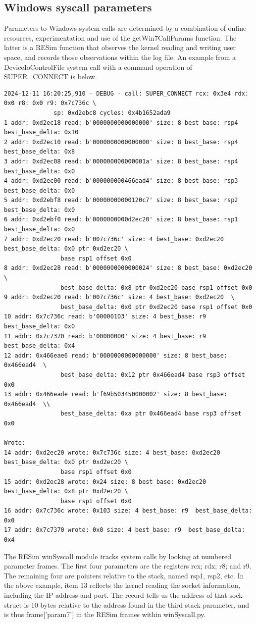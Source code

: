 \documentclass[titlepage]{article}
\begin{document}
\begin{appendices}
\subsection{Windows syscall parameters}
Parameters to Windows system calls are determined by a combination of online resources, experimentation and use
of the getWin7CallParams function.  The latter is a RESim function that observes the kernel reading and writing user
space, and records those observations within the log file.  An example from a DeviceIoControlFile system call with a
command operation of SUPER\_CONNECT is below.
\begin{verbatim}
2024-12-11 16:20:25,910 - DEBUG - call: SUPER_CONNECT rcx: 0x3e4 rdx: 0x0 r8: 0x0 r9: 0x7c736c \
              sp: 0xd2ebc8 cycles: 0x4b1652ada9
1 addr: 0xd2ec18 read: b'0000000000000000' size: 8 best_base: rsp4  best_base_delta: 0x10
2 addr: 0xd2ec10 read: b'0000000000000000' size: 8 best_base: rsp4  best_base_delta: 0x8
3 addr: 0xd2ec08 read: b'000000000000001a' size: 8 best_base: rsp4  best_base_delta: 0x0
4 addr: 0xd2ec00 read: b'000000000466ead4' size: 8 best_base: rsp3  best_base_delta: 0x0
5 addr: 0xd2ebf8 read: b'00000000000120c7' size: 8 best_base: rsp2  best_base_delta: 0x0
6 addr: 0xd2ebf0 read: b'0000000000d2ec20' size: 8 best_base: rsp1  best_base_delta: 0x0
7 addr: 0xd2ec20 read: b'007c736c' size: 4 best_base: 0xd2ec20  best_base_delta: 0x0 ptr 0xd2ec20 \
                base rsp1 offset 0x0
8 addr: 0xd2ec28 read: b'0000000000000024' size: 8 best_base: 0xd2ec20  \
                best_base_delta: 0x8 ptr 0xd2ec20 base rsp1 offset 0x0
9 addr: 0xd2ec20 read: b'007c736c' size: 4 best_base: 0xd2ec20  \
                best_base_delta: 0x0 ptr 0xd2ec20 base rsp1 offset 0x0
10 addr: 0x7c736c read: b'00000103' size: 4 best_base: r9  best_base_delta: 0x0
11 addr: 0x7c7370 read: b'00000000' size: 4 best_base: r9  best_base_delta: 0x4
12 addr: 0x466eae6 read: b'0000000000000000' size: 8 best_base: 0x466ead4  \
                best_base_delta: 0x12 ptr 0x466ead4 base rsp3 offset 0x0
13 addr: 0x466eade read: b'f69b503450000002' size: 8 best_base: 0x466ead4  \\
                best_base_delta: 0xa ptr 0x466ead4 base rsp3 offset 0x0

Wrote:
14 addr: 0xd2ec20 wrote: 0x7c736c size: 4 best_base: 0xd2ec20  best_base_delta: 0x0 ptr 0xd2ec20 \
                base rsp1 offset 0x0
15 addr: 0xd2ec28 wrote: 0x24 size: 8 best_base: 0xd2ec20  best_base_delta: 0x8 ptr 0xd2ec20 \
                base rsp1 offset 0x0
16 addr: 0x7c736c wrote: 0x103 size: 4 best_base: r9  best_base_delta: 0x0
17 addr: 0x7c7370 wrote: 0x0 size: 4 best_base: r9  best_base_delta: 0x4
\end{verbatim}
The RESim winSyscall module tracks system calls by looking at numbered parameter frames.  The first four parameters
are the registers rcx; rdx; r8; and r9.  The remaining four are pointers relative to the stack, named rsp1, rsp2, etc.
In the above example, item 13 reflects the kernel reading the socket information, including the IP address and port.
The record tells us the address of that sock struct is 10 bytes relative to the address found in the third stack parameter,
and is thus frame['param7'] in the RESim frames within winSyscall.py.


\end{appendices}
\end{document}
